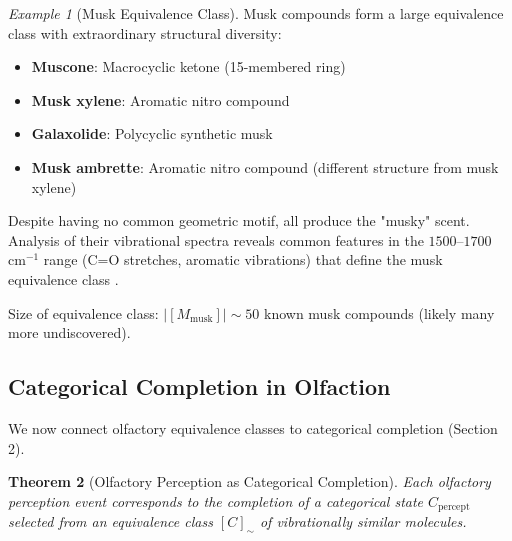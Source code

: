 \documentclass[11pt]{article}
\newtheorem{theorem}{Theorem}[section]
\theoremstyle{remark}
\newtheorem{example}[theorem]{Example}
\begin{document}
\begin{example}[Musk Equivalence Class]
\label{ex:musk_equivalence}
Musk compounds form a large equivalence class with extraordinary structural diversity:

\begin{itemize}
\item \textbf{Muscone}: Macrocyclic ketone (15-membered ring)
\item \textbf{Musk xylene}: Aromatic nitro compound
\item \textbf{Galaxolide}: Polycyclic synthetic musk
\item \textbf{Musk ambrette}: Aromatic nitro compound (different structure from musk xylene)
\end{itemize}

Despite having no common geometric motif, all produce the "musky" scent. Analysis of their vibrational spectra reveals common features in the $1500$--$1700$ cm$^{-1}$ range (C=O stretches, aromatic vibrations) that define the musk equivalence class \cite{turin2002mechanism}.

Size of equivalence class: $|[M_{\text{musk}}]| \sim 50$ known musk compounds (likely many more undiscovered).
\end{example}

\subsection{Categorical Completion in Olfaction}

We now connect olfactory equivalence classes to categorical completion (Section 2).

\begin{theorem}[Olfactory Perception as Categorical Completion]
\label{thm:olfactory_categorical}
Each olfactory perception event corresponds to the completion of a categorical state $C_{\text{percept}}$ selected from an equivalence class $[C]_{\sim}$ of vibrationally similar molecules.
\end{theorem}
\end{document}
